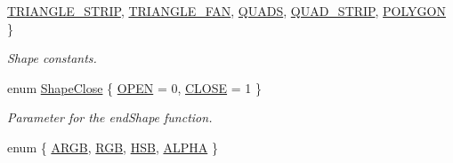 \begin{DoxyCompactItemize}
\hyperlink{namespacecprocessing_a03538783321a3683ed8660f8bb23cd0caabc8a5a48b21c675a357bad6ddf779d7}{\-T\-R\-I\-A\-N\-G\-L\-E\-\_\-\-S\-T\-R\-I\-P}, 
\hyperlink{namespacecprocessing_a03538783321a3683ed8660f8bb23cd0ca13c88e2d578ad1509abed598eec0f56e}{\-T\-R\-I\-A\-N\-G\-L\-E\-\_\-\-F\-A\-N}, 
\hyperlink{namespacecprocessing_a03538783321a3683ed8660f8bb23cd0ca5a883dcd8595f180da9df1e0944a117f}{\-Q\-U\-A\-D\-S}, 
\*
\hyperlink{namespacecprocessing_a03538783321a3683ed8660f8bb23cd0ca43a71ddaa77c62104cb6ba49de71dc7d}{\-Q\-U\-A\-D\-\_\-\-S\-T\-R\-I\-P}, 
\hyperlink{namespacecprocessing_a03538783321a3683ed8660f8bb23cd0ca149dd8e5620ef53851035a9b39b47735}{\-P\-O\-L\-Y\-G\-O\-N}
 \}
\begin{DoxyCompactList}\small\item\em \-Shape constants. \end{DoxyCompactList}\item 
enum \hyperlink{namespacecprocessing_a36043bfddd24515bdaf0987869333293}{\-Shape\-Close} \{ \hyperlink{namespacecprocessing_a36043bfddd24515bdaf0987869333293a06badcdd1d10bb1cbb7db4f90a3e3aca}{\-O\-P\-E\-N} =  0, 
\hyperlink{namespacecprocessing_a36043bfddd24515bdaf0987869333293ab4a66e300f7f1025e6cfebad41665070}{\-C\-L\-O\-S\-E} =  1
 \}
\begin{DoxyCompactList}\small\item\em \-Parameter for the end\-Shape function. \end{DoxyCompactList}\item 
enum \{ \hyperlink{namespacecprocessing_a9b569822741b2c00fca52ba8514a19f3af1455f1c4fd332b7146ef56c8a64b0df}{\-A\-R\-G\-B}, 
\hyperlink{namespacecprocessing_a9b569822741b2c00fca52ba8514a19f3a4b4eae611ef3da1c82467b67ab76d5bc}{\-R\-G\-B}, 
\hyperlink{namespacecprocessing_a9b569822741b2c00fca52ba8514a19f3a309278d84636598ea1e50818ceef1f75}{\-H\-S\-B}, 
\hyperlink{namespacecprocessing_a9b569822741b2c00fca52ba8514a19f3a60ba0a866779bfa8235a662ff62a7915}{\-A\-L\-P\-H\-A}
 \}
\end{DoxyCompactItemize}
